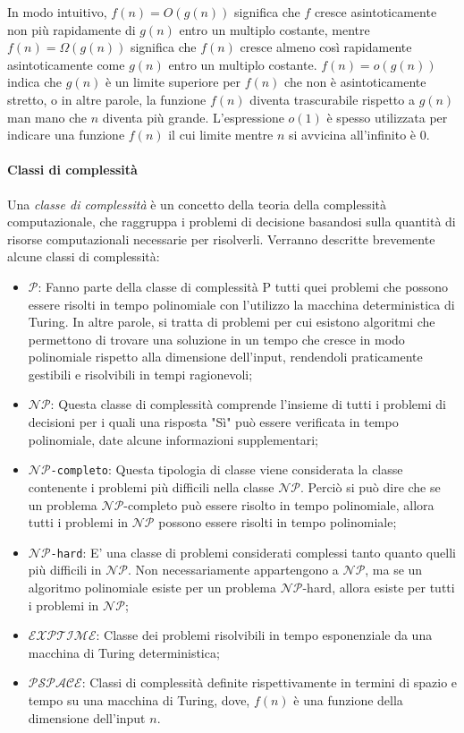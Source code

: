 \documentclass{article}
\theoremstyle{definition}
\begin{document}
In modo intuitivo, \(f(n) = O(g(n))\) significa che \(f\) cresce asintoticamente non più rapidamente di \(g(n)\) entro un multiplo costante, mentre \(f(n) = \Omega(g(n))\) significa che \(f(n)\) cresce almeno così rapidamente asintoticamente come \(g(n)\) entro un multiplo costante. \(f(n) = o(g(n))\) indica che \(g(n)\) è un limite superiore per \(f(n)\) che non è asintoticamente stretto, o in altre parole, la funzione \(f(n)\) diventa trascurabile rispetto a \(g(n)\) man mano che \(n\) diventa più grande. L'espressione \(o(1)\) è spesso utilizzata per indicare una funzione \(f(n)\) il cui limite mentre \(n\) si avvicina all'infinito è \(0\).


\paragraph{Classi di complessità}
Una \emph{classe di complessità} è un concetto della teoria della complessità computazionale, che raggruppa i problemi di decisione basandosi sulla quantità di risorse computazionali necessarie per risolverli.
Verranno descritte brevemente alcune classi di complessità:
\begin{itemize}[label={\textbullet}]
  \item \texttt{$\mathcal{P}$}: Fanno parte della classe di complessità P tutti quei problemi che possono essere risolti in tempo polinomiale con l'utilizzo la macchina deterministica di Turing. In altre parole, si tratta di problemi per cui esistono algoritmi che permettono di trovare una soluzione in un tempo che cresce in modo polinomiale rispetto alla dimensione dell'input, rendendoli praticamente gestibili e risolvibili in tempi ragionevoli;
  \item \texttt{$\mathcal{NP}$}: Questa classe di complessità comprende l'insieme di tutti i problemi di decisioni per i quali una risposta "Sì" può essere verificata in tempo polinomiale, date alcune informazioni supplementari;
  \item \texttt{$\mathcal{NP}$-completo}: Questa tipologia di classe viene considerata la classe contenente i problemi più difficili nella classe {$\mathcal{NP}$}. Perciò si può dire che se un problema {$\mathcal{NP}$-completo} può essere risolto in tempo polinomiale, allora tutti i problemi in {$\mathcal{NP}$} possono essere risolti in tempo polinomiale;
  \item \texttt{$\mathcal{NP}$-hard}: E' una classe di problemi considerati complessi tanto quanto quelli più difficili in {$\mathcal{NP}$}. Non necessariamente appartengono a {$\mathcal{NP}$}, ma se un algoritmo polinomiale esiste per un problema {$\mathcal{NP}$-hard}, allora esiste per tutti i problemi in {$\mathcal{NP}$};
  \item \texttt{$\mathcal{EXPTIME}$}: Classe dei problemi risolvibili in tempo esponenziale da una macchina di Turing deterministica;
  \item \texttt{$\mathcal{PSPACE}$}: Classi di complessità definite rispettivamente in termini di spazio e tempo su una macchina di Turing, dove, $f(n)$ è una funzione della dimensione dell'input $n$.
\end{itemize}
\end{document}
